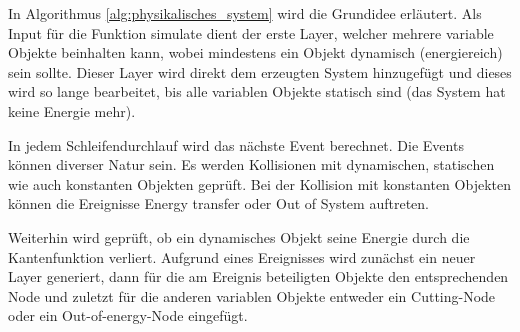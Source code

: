 In Algorithmus \ref{alg:physikalisches_system} wird die Grundidee erläutert.
Als Input für die Funktion \glqq simulate\grqq{} dient der erste Layer,
welcher mehrere variable Objekte beinhalten kann, wobei mindestens ein Objekt dynamisch (energiereich) sein sollte.
Dieser Layer wird direkt dem erzeugten System hinzugefügt und dieses wird so lange bearbeitet,
bis alle variablen Objekte statisch sind (das System hat keine Energie mehr).

In jedem Schleifendurchlauf wird das nächste Event berechnet.
Die Events können diverser Natur sein.
Es werden Kollisionen mit dynamischen, statischen wie auch konstanten Objekten geprüft.
Bei der Kollision mit konstanten Objekten können die Ereignisse \glqq Energy transfer\grqq{} oder \glqq Out of
System\grqq{} auftreten.

Weiterhin wird geprüft, ob ein dynamisches Objekt seine Energie durch die Kantenfunktion verliert.
Aufgrund eines Ereignisses wird zunächst ein neuer Layer generiert, dann für die am Ereignis beteiligten Objekte
den entsprechenden Node und zuletzt für die anderen
variablen Objekte entweder ein \glqq Cutting-Node\grqq{} oder ein \glqq Out-of-energy-Node\grqq{} eingefügt.

